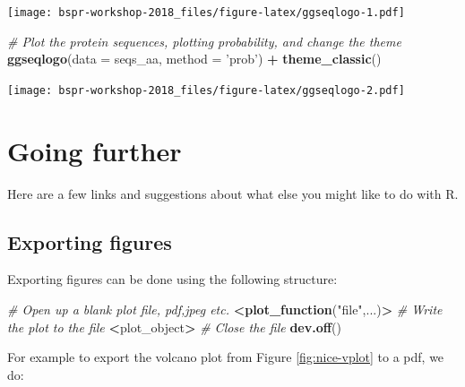 \documentclass[12pt,]{book}
\newenvironment{Shaded}{\begin{snugshade}}{\end{snugshade}}
\newcommand{\CommentTok}[1]{\textcolor[rgb]{0.56,0.35,0.01}{\textit{#1}}}
\newcommand{\DataTypeTok}[1]{\textcolor[rgb]{0.13,0.29,0.53}{#1}}
\newcommand{\ErrorTok}[1]{\textcolor[rgb]{0.64,0.00,0.00}{\textbf{#1}}}
\newcommand{\KeywordTok}[1]{\textcolor[rgb]{0.13,0.29,0.53}{\textbf{#1}}}
\newcommand{\NormalTok}[1]{#1}
\newcommand{\OperatorTok}[1]{\textcolor[rgb]{0.81,0.36,0.00}{\textbf{#1}}}
\newcommand{\StringTok}[1]{\textcolor[rgb]{0.31,0.60,0.02}{#1}}
\begin{document}
\texttt{[image: bspr-workshop-2018\_files/figure-latex/ggseqlogo-1.pdf]}

\begin{Shaded}
\begin{Highlighting}[]
\CommentTok{# Plot the protein sequences, plotting probability, and change the theme}
\KeywordTok{ggseqlogo}\NormalTok{(}\DataTypeTok{data =}\NormalTok{ seqs_aa, }\DataTypeTok{method =} \StringTok{'prob'}\NormalTok{) }\OperatorTok{+}
\StringTok{  }\KeywordTok{theme_classic}\NormalTok{()}
\end{Highlighting}
\end{Shaded}

\texttt{[image: bspr-workshop-2018\_files/figure-latex/ggseqlogo-2.pdf]}

\hypertarget{going-further}{%
\chapter{Going further}\label{going-further}}

Here are a few links and suggestions about what else you might like to do with
R.

\hypertarget{export-figs}{%
\section{Exporting figures}\label{export-figs}}

Exporting figures can be done using the following structure:

\begin{Shaded}
\begin{Highlighting}[]
\CommentTok{# Open up a blank plot file, pdf,jpeg etc.}
\OperatorTok{<}\KeywordTok{plot_function}\NormalTok{(}\StringTok{"file"}\NormalTok{,...)}\OperatorTok{>}
\CommentTok{# Write the plot to the file}
\ErrorTok{<}\NormalTok{plot_object}\OperatorTok{>}
\CommentTok{# Close the file}
\KeywordTok{dev.off}\NormalTok{()}
\end{Highlighting}
\end{Shaded}

For example to export the volcano plot from Figure \ref{fig:nice-vplot} to a pdf, we do:
\end{document}

